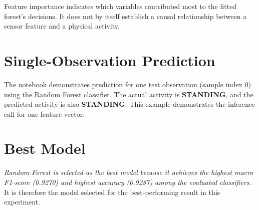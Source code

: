 Feature importance indicates which variables contributed most to the fitted forest's decisions. It does not by itself establish a causal relationship between a sensor feature and a physical activity.

\section{Single-Observation Prediction}
The notebook demonstrates prediction for one test observation (sample index 0) using the Random Forest classifier. The actual activity is \textbf{STANDING}, and the predicted activity is also \textbf{STANDING}. This example demonstrates the inference call for one feature vector.

\section{Best Model}
\emph{Random Forest is selected as the best model because it achieves the highest macro F1-score (0.9270) and highest accuracy (0.9287) among the evaluated classifiers.} It is therefore the model selected for the best-performing result in this experiment.
